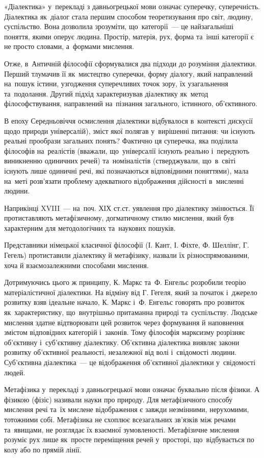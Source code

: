 \documentclass[a5paper,oneside,DIV=12,12pt,headings=small]{scrartcl}
\begin{document}
		«Діалектика» у~перекладі з давньогрецької мови означає суперечку, суперечність. Діалектика як~діалог стала першим способом теоретизування про світ, людину, суспільство. Вона дозволила зрозуміти, що~категорії~— це найзагальніші поняття, якими оперує людина. Простір, матерія, рух, форма та~інші категорії є не просто словами, а~формами мислення.
		
		Отже, в~Античній філософії сформувалися два підходи до розуміння діалектики. Перший тлумачив її як~мистецтво суперечки, форму діалогу, який направлений на~пошук істини, узгодження суперечливих точок зору, їх узагальнення та~подолання. Другий підхід характеризував діалектику як~метод філософствування, направлений на~пізнання загального, істинного, об'єктивного.
		
		В епоху Середньовіччя осмислення діалектики відбувалося в~контексті дискусії щодо природи універсалій), зміст якої полягав у~вирішенні питання: чи існують реальні прообрази загальних понять? Фактично ця суперечка, яка поділила філософів на~реалістів (вважали, що~універсалії існують реально і~передують виникненню одиничних речей) та~номіналістів (стверджували, що~в~світі існують лише одиничні речі, які позначаються відповідними поняттями), мала на~меті розв'язати проблему адекватного відображення дійсності в~мисленні людини.
		
		Наприкінці XVIII~— на~поч. ХІХ ст.ст. уявлення про діалектику змінюється. Її протиставляють метафізичному, догматичному стилю мислення, який був характерним для методологічних та~наукових пошуків.
		
		Представники німецької класичної філософії (І. Кант, І. Фіхте, Ф. Шеллінг, Г. Гегель) протиставили діалектику й метафізику, назвали їх різноспрямованими, хоча й взаємозалежними способами мислення.
		
		Дотримуючись цього ж принципу, К. Маркс та~Ф. Енгельс розробили теорію матеріалістичної діалектики. На відміну від Г. Гегеля, який за початок і~джерело розвитку взяв ідеальне начало, К. Маркс і~Ф. Енгельс говорять про розвиток як~характеристику, що~внутрішньо притаманна природі та~суспільству. Людське мислення здатне відтворювати цей розвиток через формування й наповнення змістом відповідних категорій і~законів. Тому філософія марксизму розрізняє об'єктивну і~суб'єктивну діалектику. Об'єктивна діалектика виявляє закони розвитку об'єктивної реальності, незалежної від волі і~свідомості людини. Суб'єктивна діалектика~— це відображення об'єктивної діалектики у~свідомості людей.
		
		Метафізика у~перекладі з давньогрецької мови означає буквально після фізики. А фізикою (фізіс) називали науки про природу. Для метафізичного способу мислення речі та~їх мислене відображення є завжди незмінними, нерухомими, тотожними собі. Метафізика не схоплює всезагальних зв'язків між речами та~явищами, не розглядає їх взаємної зумовленості. Метафізичне мислення розуміє рух лише як~просте переміщення речей у~просторі, що~відбувається по колу або по прямій лінії.
		
\end{document}
